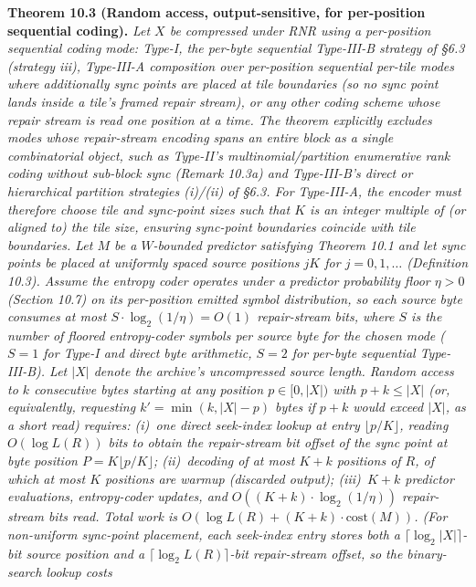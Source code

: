 \documentclass[
]{article}
\begin{document}
\textbf{Theorem 10.3 (Random access, output-sensitive, for
per-position sequential coding).} \emph{Let $X$ be compressed under
RNR using a \emph{per-position sequential} coding mode: Type-I, the
per-byte sequential Type-III-B strategy of §6.3 (strategy iii),
Type-III-A composition over per-position sequential per-tile modes
where additionally sync points are placed at tile boundaries (so
no sync point lands inside a tile's framed repair stream), or any
other coding scheme whose repair stream is read one position at a
time. The theorem explicitly excludes modes whose repair-stream
encoding spans an entire block as a single combinatorial object,
such as Type-II's multinomial/partition enumerative rank coding
without sub-block sync (Remark 10.3a) and Type-III-B's direct or
hierarchical partition strategies (i)/(ii) of §6.3. For Type-III-A,
the encoder must therefore choose tile and sync-point sizes such
that $K$ is an integer multiple of (or aligned to) the tile size,
ensuring sync-point boundaries coincide with tile boundaries. Let $M$ be a $W$-bounded predictor satisfying Theorem 10.1
and let sync points be placed
at uniformly spaced source positions $j K$ for $j = 0, 1, \dots$
(Definition 10.3). Assume the entropy coder operates under a
predictor probability floor $\eta > 0$ (Section 10.7) on its
per-position emitted symbol distribution, so each source byte
consumes at most $S \cdot \log_2(1/\eta) = O(1)$ repair-stream
bits, where $S$ is the number of floored entropy-coder symbols per
source byte for the chosen mode ($S = 1$ for Type-I and direct byte
arithmetic, $S = 2$ for per-byte sequential Type-III-B). Let $|X|$ denote the archive's uncompressed source length.
Random access to $k$ consecutive bytes starting at any position
$p \in [0, |X|)$ with $p + k \leq |X|$ (or, equivalently, requesting
$k' = \min(k, |X| - p)$ bytes if $p + k$ would exceed $|X|$, as a
short read) requires: (i)~one direct seek-index lookup at
entry $\lfloor p/K \rfloor$, reading $O(\log L(R))$ bits to obtain
the repair-stream bit offset of the sync point at byte position
$P = K \lfloor p/K \rfloor$; (ii)~decoding of at most $K + k$
positions of $R$, of which at most $K$ positions are warmup
(discarded output); (iii)~$K + k$ predictor evaluations,
entropy-coder updates, and $O((K+k) \cdot \log_2(1/\eta))$
repair-stream bits read. Total work is
$O(\log L(R) + (K + k) \cdot \mathrm{cost}(M))$. (For non-uniform
sync-point placement, each seek-index entry stores both a
$\lceil \log_2 |X| \rceil$-bit source position and a
$\lceil \log_2 L(R) \rceil$-bit repair-stream offset, so the
binary-search lookup costs
}
\end{document}
